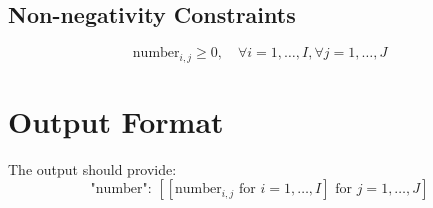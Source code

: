 \documentclass{article}
\begin{document}
\subsection*{Non-negativity Constraints}
\[
\text{number}_{i,j} \geq 0, \quad \forall i = 1, \ldots, I, \forall j = 1, \ldots, J
\]

\section*{Output Format}
The output should provide:
\[
\text{"number": } \left[ \left[ \text{number}_{i,j} \text{ for } i=1,\ldots,I \right] \text{ for } j=1,\ldots,J \right]
\]
\end{document}
